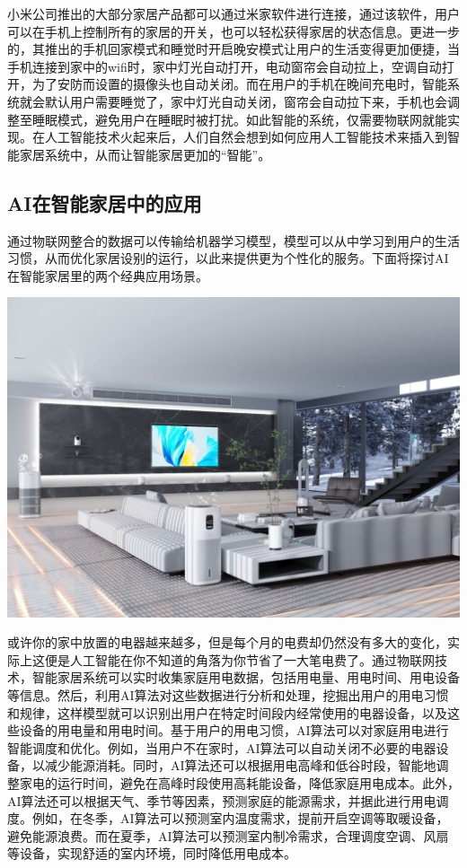 小米公司推出的大部分家居产品都可以通过米家软件进行连接，通过该软件，用户可以在手机上控制所有的家居的开关，也可以轻松获得家居的状态信息。更进一步的，其推出的手机回家模式和睡觉时开启晚安模式让用户的生活变得更加便捷，当手机连接到家中的wifi时，家中灯光自动打开，电动窗帘会自动拉上，空调自动打开，为了安防而设置的摄像头也自动关闭。而在用户的手机在晚间充电时，智能系统就会默认用户需要睡觉了，家中灯光自动关闭，窗帘会自动拉下来，手机也会调整至睡眠模式，避免用户在睡眠时被打扰。如此智能的系统，仅需要物联网就能实现。在人工智能技术火起来后，人们自然会想到如何应用人工智能技术来插入到智能家居系统中，从而让智能家居更加的“智能”。

\subsection{AI在智能家居中的应用}
通过物联网整合的数据可以传输给机器学习模型，模型可以从中学习到用户的生活习惯，从而优化家居设别的运行，以此来提供更为个性化的服务。下面将探讨AI在智能家居里的两个经典应用场景。

\begin{marginfigure}
\includegraphics{images/Internet_09.png}
\end{marginfigure}

或许你的家中放置的电器越来越多，但是每个月的电费却仍然没有多大的变化，实际上这便是人工智能在你不知道的角落为你节省了一大笔电费了。通过物联网技术，智能家居系统可以实时收集家庭用电数据，包括用电量、用电时间、用电设备等信息。然后，利用AI算法对这些数据进行分析和处理，挖掘出用户的用电习惯和规律，这样模型就可以识别出用户在特定时间段内经常使用的电器设备，以及这些设备的用电量和用电时间。基于用户的用电习惯，AI算法可以对家庭用电进行智能调度和优化。例如，当用户不在家时，AI算法可以自动关闭不必要的电器设备，以减少能源消耗。同时，AI算法还可以根据用电高峰和低谷时段，智能地调整家电的运行时间，避免在高峰时段使用高耗能设备，降低家庭用电成本。此外，AI算法还可以根据天气、季节等因素，预测家庭的能源需求，并据此进行用电调度。例如，在冬季，AI算法可以预测室内温度需求，提前开启空调等取暖设备，避免能源浪费。而在夏季，AI算法可以预测室内制冷需求，合理调度空调、风扇等设备，实现舒适的室内环境，同时降低用电成本。

